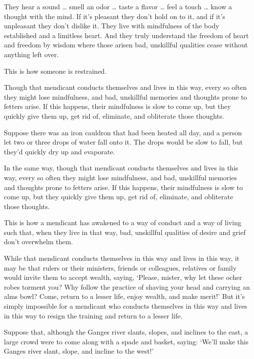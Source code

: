 \documentclass[12pt,openany]{book}%
\begin{document}
They hear a sound … smell an odor … taste a flavor … feel a touch … know a thought with the mind. If it’s pleasant they don’t hold on to it, and if it’s unpleasant they don’t dislike it. They live with mindfulness of the body established and a limitless heart. And they truly understand the freedom of heart and freedom by wisdom where those arisen bad, unskillful qualities cease without anything left over. 

This is how someone is restrained. 

Though that mendicant conducts themselves and lives in this way, every so often they might lose mindfulness, and bad, unskillful memories and thoughts prone to fetters arise. If this happens, their mindfulness is slow to come up, but they quickly give them up, get rid of, eliminate, and obliterate those thoughts. 

Suppose there was an iron cauldron that had been heated all day, and a person let two or three drops of water fall onto it. The drops would be slow to fall, but they’d quickly dry up and evaporate. 

In the same way, though that mendicant conducts themselves and lives in this way, every so often they might lose mindfulness, and bad, unskillful memories and thoughts prone to fetters arise. If this happens, their mindfulness is slow to come up, but they quickly give them up, get rid of, eliminate, and obliterate those thoughts. 

This is how a mendicant has awakened to a way of conduct and a way of living such that, when they live in that way, bad, unskillful qualities of desire and grief don’t overwhelm them. 

While that mendicant conducts themselves in this way and lives in this way, it may be that rulers or their ministers, friends or colleagues, relatives or family would invite them to accept wealth, saying, ‘Please, mister, why let these ocher robes torment you? Why follow the practice of shaving your head and carrying an alms bowl? Come, return to a lesser life, enjoy wealth, and make merit!’ But it’s simply impossible for a mendicant who conducts themselves in this way and lives in this way to resign the training and return to a lesser life. 

Suppose that, although the Ganges river slants, slopes, and inclines to the east, a large crowd were to come along with a spade and basket, saying: ‘We’ll make this Ganges river slant, slope, and incline to the west!’ 
\end{document}
